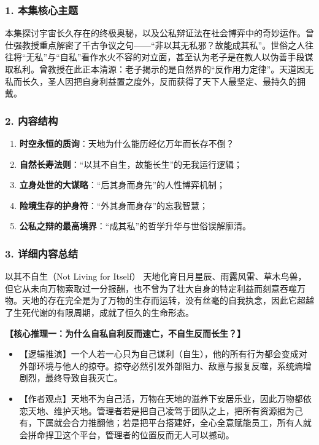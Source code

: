 \subsubsection{1. 本集核心主题}
本集探讨宇宙长久存在的终极奥秘，以及公私辩证法在社会博弈中的奇妙运作。曾仕强教授重点解密了千古争议之句——“非以其无私邪？故能成其私”。世俗之人往往将“无私”与“自私”看作水火不容的对立面，甚至认为老子是在教人以伪善手段谋取私利。曾教授在此正本清源：老子揭示的是自然界的“反作用力定律”。天道因无私而长久，圣人因把自身利益置之度外，反而获得了天下人最坚定、最持久的拥戴。

\subsubsection{2. 内容结构}
\begin{enumerate}
    \item \textbf{时空永恒的质询}：天地为什么能历经亿万年而长存不倒？
    \item \textbf{自然长寿法则}：“以其不自生，故能长生”的无我运行逻辑；
    \item \textbf{立身处世的大谋略}：“后其身而身先”的人性博弈机制；
    \item \textbf{险境生存的护身符}：“外其身而身存”的忘我智慧；
    \item \textbf{公私之辩的最高境界}：“成其私”的哲学升华与世俗误解廓清。
\end{enumerate}

\subsubsection{3. 详细内容总结}

\begin{ConceptBox}{以其不自生（Not Living for Itself）}
天地化育日月星辰、雨露风雷、草木鸟兽，但它从未向万物索取过一分报酬，也不曾为了壮大自身的特定利益而刻意吞噬万物。天地的存在完全是为了万物的生存而运转，没有丝毫的自我执念，因此它超越了生死代谢的有限周期，成就了恒久的生命形态。
\end{ConceptBox}

\noindent\textbf{【核心推理一：为什么自私自利反而速亡，不自生反而长生？】}
\begin{itemize}
    \item 【逻辑推演】一个人若一心只为自己谋利（自生），他的所有行为都会变成对外部环境与他人的掠夺。掠夺必然引发外部阻力、敌意与报复反噬，系统熵增剧烈，最终导致自我灭亡。
    \item 【作者观点】天地不为自己活，万物在天地的滋养下安居乐业，因此万物都依恋天地、维护天地。管理者若是把自己凌驾于团队之上，把所有资源据为己有，下属就会合力推翻他；若是把平台搭建好，全心全意赋能员工，所有人就会拼命捍卫这个平台，管理者的位置反而无人可以撼动。
\end{itemize}


